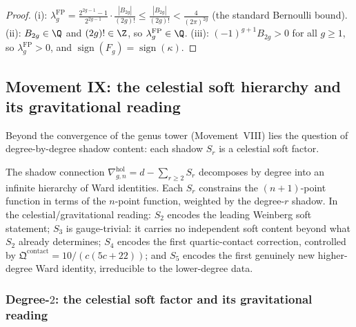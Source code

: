 \begin{proof}
(i): $\lambda_g^{\mathrm{FP}}
= \frac{2^{2g-1}-1}{2^{2g-1}} \cdot \frac{|B_{2g}|}{(2g)!}
\le \frac{|B_{2g}|}{(2g)!} < \frac{4}{(2\pi)^{2g}}$
(the standard Bernoulli bound).
(ii): $B_{2g} \in \Q$ and $(2g)! \in \Z$, so
$\lambda_g^{\mathrm{FP}} \in \Q$.
(iii): $(-1)^{g+1}B_{2g} > 0$ for all $g \ge 1$,
so $\lambda_g^{\mathrm{FP}} > 0$, and
$\operatorname{sign}(F_g) = \operatorname{sign}(\kappa)$.
\end{proof}



\subsection{Movement IX: the celestial soft hierarchy and its gravitational reading}
\label{subsec:gravity-soft-theorems}

Beyond the convergence of the genus tower (Movement~VIII)
lies the question of degree-by-degree shadow content:
each shadow $S_r$ is a celestial soft factor.

The shadow connection
$\nabla^{\mathrm{hol}}_{g,n} = d - \sum_{r \ge 2} S_r$
decomposes by degree into an infinite hierarchy of Ward identities.
Each $S_r$ constrains the
$(n+1)$-point function in terms of the $n$-point function,
weighted by the degree-$r$ shadow. In the celestial/gravitational
reading:
$S_2$ encodes the leading Weinberg soft statement;
$S_3$ is gauge-trivial: it carries no independent soft content
beyond what $S_2$ already determines;
$S_4$ encodes the first quartic-contact correction, controlled by
$\mathfrak{Q}^{\mathrm{contact}} = 10/(c(5c+22))$;
and $S_5$ encodes the first genuinely new higher-degree Ward identity,
irreducible to the lower-degree data.

\subsubsection*{Degree-$2$: the celestial soft factor and its gravitational reading}

